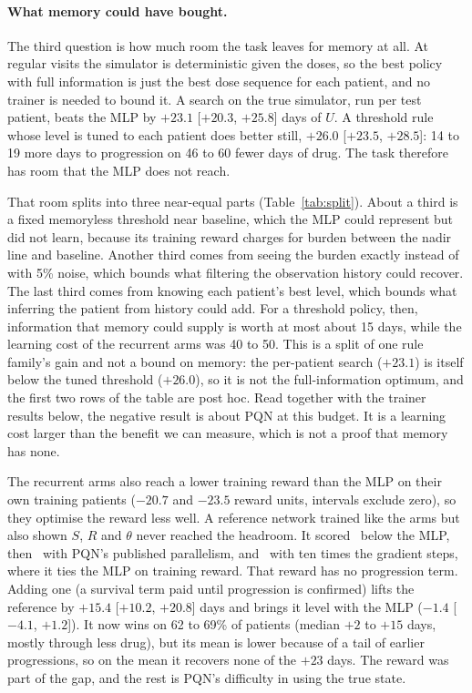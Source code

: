 \documentclass[10pt]{article}
\begin{document}
\paragraph{What memory could have bought.} The third question is how much room
the task leaves for memory at all. At regular visits the simulator is
deterministic given the doses, so the best policy with full information is just
the best dose sequence for each patient, and no trainer is needed to bound it. A
search on the true simulator, run per test patient, beats the MLP by $+23.1$
[$+20.3$, $+25.8$] days of $U$. A threshold rule whose level is tuned to each
patient does better still, $+26.0$ [$+23.5$, $+28.5$]: 14 to 19 more days to
progression on 46 to 60 fewer days of drug. The task therefore has room that the
MLP does not reach. %

That room splits into three near-equal parts (Table~\ref{tab:split}). About a
third is a fixed memoryless threshold near baseline, which the MLP could
represent but did not learn, because its training reward charges for burden
between the nadir line and baseline. Another third comes from seeing the burden
exactly instead of with 5\% noise, which bounds what filtering the observation
history could recover. The last third comes from knowing each patient's best
level, which bounds what inferring the patient from history could add. For a
threshold policy, then, information that memory could supply is worth at most
about 15 days, while the learning cost of the recurrent arms was 40 to 50. This is a
split of one rule family's gain and not a bound on memory: the per-patient
search ($+23.1$) is itself below the tuned threshold ($+26.0$), so it is not the
full-information optimum, and the first two rows of the table are post hoc.
Read together with the trainer results below, the negative result is about
PQN at this budget. It is a learning cost larger than the benefit we can
measure, which is not a proof that memory has none. %

The recurrent arms also reach a lower training reward than the MLP on their own
training patients ($-20.7$ and $-23.5$ reward units, intervals exclude zero), so
they optimise the reward less well. %
A reference network trained like the arms but also shown $S$, $R$ and $\theta$
never reached the headroom. It scored \HFullZero\ below the MLP, then
\SThreeFull\ with PQN's published parallelism, and \TOneFull\ with ten times
the gradient steps, where it ties the MLP on training reward. That reward has no
progression term. Adding one (a survival term paid until progression is
confirmed) lifts the reference by $+15.4$ [$+10.2$, $+20.8$] days and brings it
level with the MLP ($-1.4$ [$-4.1$, $+1.2$]). It now wins on 62 to 69\% of
patients (median $+2$ to $+15$ days, mostly through less drug), but its mean is
lower because of a tail of earlier progressions, so on the mean it recovers none
of the $+23$ days. The reward was part of the gap, and the rest is PQN's
difficulty in using the true state. %
\end{document}
